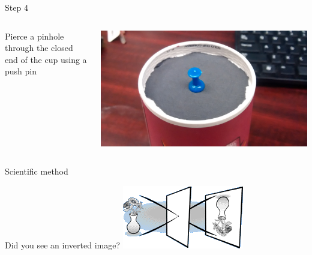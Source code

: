 \begin{frame}{Step 4}
  \begin{columns}
    \begin{column}{0.6\textwidth}
      Pierce a pinhole through the closed end of the cup using a push pin
    \end{column}
    \begin{column}{0.4\textwidth}
      \includegraphics[width=\textwidth]{media/pushpin.jpg}
    \end{column}
  \end{columns}
\end{frame}

\begin{frame}[fragile]{Scientific method}
  
\end{frame}

\begin{frame}{Did you see an inverted image?}
  \centering
  \includegraphics{media/upside_down_vase.png}
\end{frame}

